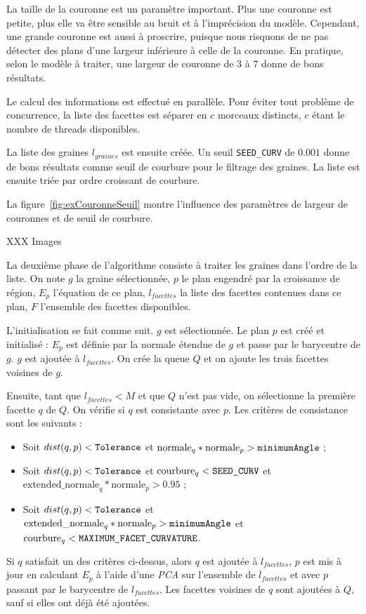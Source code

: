 ﻿\documentclass[12pt, twoside]{article}
\begin{document}
La taille de la couronne est un paramètre important. Plus une couronne est petite, plus elle va être sensible au bruit et à l'imprécision du modèle. Cependant, une grande couronne est aussi à proscrire, puisque nous risquons de ne pas détecter des plans d'une largeur inférieure à celle de la couronne. En pratique, selon le modèle à traiter, une largeur de couronne de 3 à 7 donne de bons résultats.

Le calcul des informations est effectué en parallèle. Pour éviter tout problème de concurrence, la liste des facettes est séparer en $c$ morceaux distincts, $c$ étant le nombre de threads disponibles.

La liste des graines $l_{graines}$ est ensuite créée. Un seuil \texttt{SEED\_CURV} de $0.001$ donne de bons résultats comme seuil de courbure pour le filtrage des graines. La liste est ensuite triée par ordre croissant de courbure.

La figure~\ref{fig:exCouronneSeuil} montre l'influence des paramètres de largeur de couronnes et de seuil de courbure.

XXX Images

La deuxième phase de l'algorithme consiste à traiter les graines dans l'ordre de la liste. On note $g$ la graine sélectionnée, $p$ le plan engendré par la croissance de région, $E_p$ l'équation de ce plan, $l_{facettes}$ la liste des facettes contenues dans ce plan, $F$ l'ensemble des facettes disponibles.

L'initialisation se fait comme suit. $g$ est sélectionnée. Le plan $p$ est créé et initialisé : $E_p$ est définie par la normale étendue de $g$ et passe par le barycentre de $g$. $g$ est ajoutée à $l_{facettes}$. On crée la queue $Q$ et on ajoute les trois facettes voisines de $g$.

Ensuite, tant que $l_{facettes} < M$ et que $Q$ n'est pas vide, on sélectionne la première facette $q$ de $Q$. On vérifie si $q$ est consistante avec $p$. Les critères de consistance sont les suivants :
\begin{itemize}
  \item Soit $dist(q, p) < \text{\texttt{Tolerance}}$ et $\text{normale}_q * \text{normale}_p > \text{\texttt{minimumAngle}}$ ;
  \item Soit $dist(q, p) < \text{\texttt{Tolerance}}$ et $\text{courbure}_q < \text{\texttt{SEED\_CURV}}$ et $\text{extended\_normale}_q * \text{normale}_p > 0.95$ ;
  \item Soit $dist(q, p) < \text{\texttt{Tolerance}}$ et $\text{extended\_normale}_q * \text{normale}_p > \text{\texttt{minimumAngle}}$ et $\text{courbure}_q < \text{\texttt{MAXIMUM\_FACET\_CURVATURE}}$.
\end{itemize}
Si $q$ satisfait un des critères ci-dessus, alors $q$ est ajoutée à $l_{facettes}$, $p$ est mis à jour en calculant $E_p$ à l'aide d'une \textit{PCA} sur l'ensemble de $l_{facettes}$ et avec $p$ passant par le barycentre de $l_{facettes}$. Les facettes voisines de $q$ sont ajoutées à $Q$, sauf si elles ont déjà été ajoutées.
\end{document}
